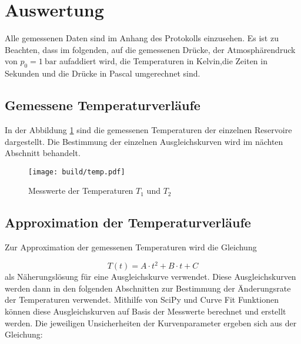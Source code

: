 \section{Auswertung}
\label{sec:Auswertung}

%
Alle gemessenen Daten sind im Anhang des Protokolls einzusehen. Es ist zu Beachten, dass im folgenden, auf die gemessenen Drücke, der Atmosphärendruck von $p_0=\SI{1}{\bar}$ aufaddiert wird, die Temperaturen in Kelvin,die Zeiten in Sekunden und die Drücke in Pascal umgerechnet sind.

\subsection{Gemessene Temperaturverläufe}
\label{ssec:a}

In der Abbildung \ref{fig:temp} sind die gemessenen Temperaturen der einzelnen Reservoire dargestellt.
Die Bestimmung der einzelnen Ausgleichskurven wird im nächten Abschnitt behandelt.
\begin{figure}
    \centering
    \texttt{[image: build/temp.pdf]}
    \caption{Messwerte der Temperaturen $T_1$ und $T_2$}
    \label{fig:temp}
\end{figure}

\subsection{Approximation der Temperaturverläufe}
\label{ssec:b} 

Zur Approximation der gemessenen Temperaturen wird die Gleichung

\begin{equation}
    T(t) = A \cdot t^2 + B \cdot t + C
    \label{eq:curvefit}
\end{equation}
als Näherungslösung für eine Ausgleichskurve verwendet. Diese Ausgleichskurven werden dann in den folgenden Abschnitten zur Bestimmung der Änderungsrate der Temperaturen verwendet.
Mithilfe von SciPy \cite{scipy} und Curve Fit Funktionen können diese Ausgleichskurven auf Basis der Messwerte berechnet und erstellt werden. 
Die jeweiligen Unsicherheiten der Kurvenparameter ergeben sich aus der Gleichung:


